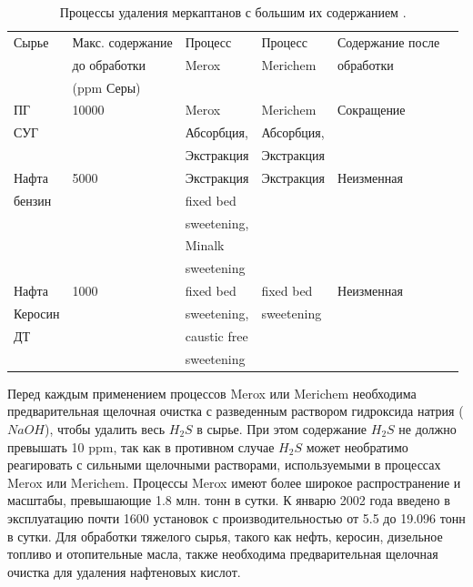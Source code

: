 \begin{table}
	\centering
	\fontsize{12}{15}\selectfont %
	\captionsetup{justification=centering} %
	\caption{Процессы удаления меркаптанов с большим их содержанием \cite{de_angelis_natural_2012}.}\label{tab:remove}
	\begin{tabular}{lllllc}
		\toprule
		Сырье   & Макс. содержание & Процесс      & Процесс    & Содержание после &  \\
		        & до обработки     & Merox        & Merichem   & обработки        &  \\
		        & (ppm Серы)       &              &            &                  &  \\ \midrule
		ПГ      & \num{10000}      & Merox        & Merichem   & Сокращение       &  \\
		СУГ     &                  & Абсорбция,   & Абсорбция, &                  &  \\
		        &                  & Экстракция   & Экстракция &                  &  \\
		Нафта   & \num{5000}       & Экстракция   & Экстракция & Неизменная       &  \\
		бензин  &                  & fixed bed    &            &                  &  \\
		        &                  & sweetening,  &            &                  &  \\
		        &                  & Minalk       &            &                  &  \\
		        &                  & sweetening   &            &                  &  \\
		Нафта   & \num{1000}       & fixed bed    & fixed bed  & Неизменная       &  \\
		Керосин &                  & sweetening,  & sweetening &                  &  \\
		ДТ      &                  & caustic free &            &                  &  \\
		        &                  & sweetening   &            &                  &  \\ \bottomrule
	\end{tabular}
\end{table}

Перед каждым применением процессов Merox или Merichem необходима предварительная щелочная очистка с разведенным раствором гидроксида натрия ($NaOH$), чтобы удалить весь $H_2S$ в сырье. При этом содержание $H_2S$ не должно превышать \num{10} ppm, так как в противном случае $H_2S$ может необратимо реагировать с сильными щелочными растворами, используемыми в процессах Merox или Merichem. Процессы Merox имеют более широкое распространение и масштабы, превышающие \num{1,8} млн. тонн в сутки. К январю \num{2002} года введено в эксплуатацию почти \num{1600} установок с производительностью от \num{5,5} до \num{19,096} тонн в сутки. Для обработки тяжелого сырья, такого как нефть, керосин, дизельное топливо и отопительные масла, также необходима предварительная щелочная очистка для удаления нафтеновых кислот.

